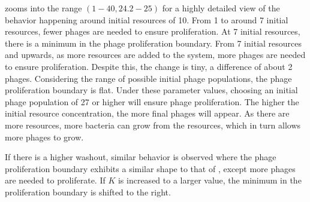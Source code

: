  zooms into the range $(1-40, 24.2-25)$ for a highly detailed view of the behavior happening around initial resources of 10. 
From 1 to around 7 initial resources, fewer phages are needed to ensure proliferation. 
At 7 initial resources, there is a minimum in the phage proliferation boundary. 
From 7 initial resources and upwards, as more resources are added to the system, more phages are needed to ensure proliferation. 
Despite this, the change is tiny, a difference of about 2 phages. 
Considering the range of possible initial phage populations, the phage proliferation boundary is flat. 
Under these parameter values, choosing an initial phage population of 27 or higher will ensure phage proliferation. 
The higher the initial resource concentration, the more final phages will appear. 
As there are more resources, more bacteria can grow from the resources, which in turn allows more phages to grow. 

If there is a higher washout, similar behavior is observed where the phage proliferation boundary exhibits a similar shape to that of , except more phages are needed to proliferate. 
If $K$ is increased to a larger value, the minimum in the proliferation boundary is shifted to the right. 

